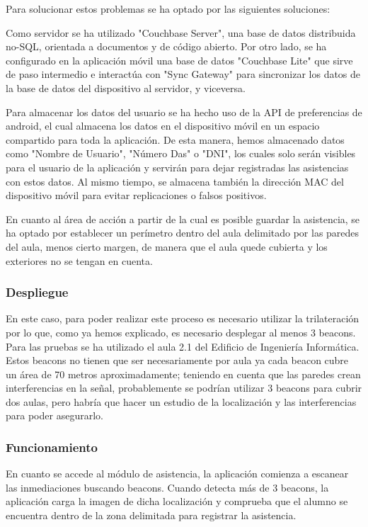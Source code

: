Para solucionar estos problemas se ha optado por las siguientes soluciones: 

Como servidor se ha utilizado "Couchbase Server", una base de datos distribuida no-SQL, orientada a documentos y de código abierto. Por otro lado, se ha configurado en la aplicación móvil una base de datos "Couchbase Lite" que sirve de paso intermedio e interactúa con "Sync Gateway" para sincronizar los datos de la base de datos del dispositivo al servidor, y viceversa.


Para almacenar los datos del usuario se ha hecho uso de la API de preferencias de android, el cual almacena los datos en el dispositivo móvil en un espacio compartido para toda la aplicación. De esta manera, hemos almacenado datos como "Nombre de Usuario", "Número Das" o "DNI", los cuales solo serán visibles para el usuario de la aplicación y servirán para dejar registradas las asistencias con estos datos. Al mismo tiempo, se almacena también la dirección MAC del dispositivo móvil para evitar replicaciones o falsos positivos.


En cuanto al área de acción a partir de la cual es posible guardar la asistencia, se ha optado por establecer un perímetro dentro del aula delimitado por las paredes del aula, menos cierto margen, de manera que el aula quede cubierta y los exteriores no se tengan en cuenta. 

\subsubsection{Despliegue}

En este caso, para poder realizar este proceso es necesario utilizar la trilateración por lo que, como ya hemos explicado, es necesario desplegar al menos 3 beacons. Para las pruebas se ha utilizado el aula 2.1 del Edificio de Ingeniería Informática. Estos beacons no tienen que ser necesariamente por aula ya cada beacon cubre un área de 70 metros aproximadamente; teniendo en cuenta que las paredes crean interferencias en la señal, probablemente se podrían utilizar 3 beacons para cubrir dos aulas, pero habría que hacer un estudio de la localización y las interferencias para poder asegurarlo. 

\subsubsection{Funcionamiento}


En cuanto se accede al módulo de asistencia, la aplicación comienza a escanear las inmediaciones buscando beacons. Cuando detecta más de 3 beacons, la aplicación carga la imagen de dicha localización y comprueba que el alumno se encuentra dentro de la zona delimitada para registrar la asistencia.

